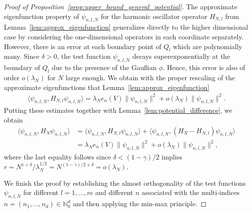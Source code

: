 \documentclass[12pt, reqno]{amsart}
\theoremstyle{definition}
\numberwithin{equation}{section}
\newcommand{\N}{{\mathbb N}}
\begin{document}
\begin{proof}[Proof of Proposition~\ref{prop:upper_bound_general_potential}]
    The approximate eigenfunction property of $\psi_{n,l,N}$ for the harmonic oscillator operator $H_{N,l}$ from Lemma~\ref{lem:approx_eigenfunction} generalizes directly to the higher dimensional case by considering the one-dimensional operators in each coordinate separately. However, there is an error at each boundary point of $Q_l$ which are polynomially many.  
    Since 
    $\delta>0$, the test function $\psi_{n,l,N}$ decays superexponentially at the boundary of $Q_l$ due to the presence of the Gaußian $\phi$. Hence, this error is also of order $o(\lambda_N)$ for $N$ large enough. We obtain with the proper rescaling of the approximate eigenfunctions that Lemma~\ref{lem:approx_eigenfunction}  
    \begin{align*}
        \langle \psi_{n,l,N},H_{N,l} \psi_{n,l,N}\rangle = \lambda_N e_n(V) \|\psi_{n,l,N}\|^2 + o(\lambda_N)\|\psi_{n,l,N}\|^2.
    \end{align*}
    Putting these estimates together with Lemma~\ref{lem:potential_difference}, we obtain
    \begin{align*}
        \langle \psi_{n,l,N},H_N \psi_{n,l,N}\rangle &=    \langle \psi_{n,l,N},H_{N,l} \psi_{n,l,N}\rangle +  \langle \psi_{n,l,N},(H_N -H_{N,l})\psi_{n,l,N}\rangle\\ 
     &= \lambda_N e_n(V) \|\psi_{n,l,N}\|^2 + o(\lambda_N)\|\psi_{n,l,N}\|^2,
    \end{align*}
    where the last equality follows since $\delta<(1-\gamma)/2$ implies $r=N^{{1+\delta}}/\lambda_N^{1/2}=N^{(1-\gamma)/2+\delta}= o(\lambda_N)$. 
    
    We finish the proof by establishing the almost orthogonality of the test functions $\psi_{n,l,N}$ for different $l=1,\ldots,m$ and different $n$ associated with the multi-indices $n=(n_1,\ldots,n_d)\in \N_0^d$ and then applying the min-max principle.


\end{proof}
\end{document}

